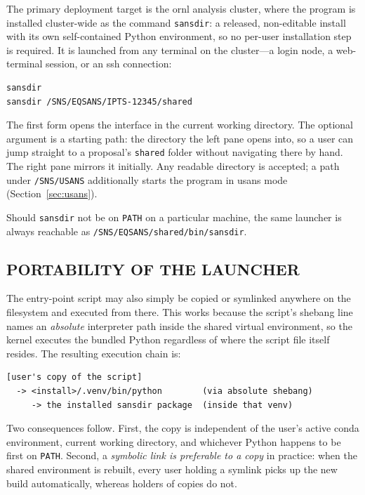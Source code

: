 \documentclass[tm]{ornltm}
\begin{document}
The primary deployment target is the \ac{ornl} analysis cluster, where the
program is installed cluster-wide as the command \texttt{sansdir}: a released,
non-editable install with its own self-contained Python environment, so no
per-user installation step is required. It is launched from any terminal on
the cluster---a login node, a web-terminal session, or an \ac{ssh}
connection:

\begin{lstlisting}[language=shellsession]
sansdir
sansdir /SNS/EQSANS/IPTS-12345/shared
\end{lstlisting}

The first form opens the interface in the current working directory. The optional
argument is a starting path: the directory the left pane opens into, so a
user can jump straight to a proposal's \texttt{shared} folder without navigating
there by hand. The right pane mirrors it initially. Any readable directory is
accepted; a path under \texttt{/SNS/USANS} additionally starts the program in
\ac{usans} mode (Section~\ref{sec:usans}).

Should \texttt{sansdir} not be on \texttt{PATH} on a particular machine, the
same launcher is always reachable as
\texttt{/SNS/EQSANS/shared/bin/sansdir}.

\subsection{PORTABILITY OF THE LAUNCHER}

The entry-point script may also simply be copied or symlinked anywhere on the
filesystem and executed from there. This works because the script's shebang
line names an \emph{absolute} interpreter path inside the shared virtual
environment, so the kernel executes the bundled Python regardless of where
the script file itself resides. The resulting execution chain is:

\begin{lstlisting}
[user's copy of the script]
  -> <install>/.venv/bin/python        (via absolute shebang)
     -> the installed sansdir package  (inside that venv)
\end{lstlisting}

Two consequences follow. First, the copy is independent of the user's active
conda environment, current working directory, and whichever Python happens to be
first on \texttt{PATH}. Second, a \emph{symbolic link is preferable to a copy}
in practice: when the shared environment is rebuilt, every user holding a symlink
picks up the new build automatically, whereas holders of copies do not.
\end{document}
